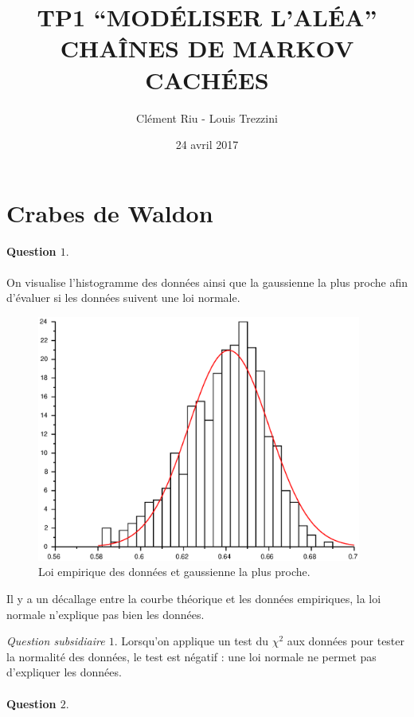 \documentclass[12pt,a4paper]{article}
\title{\textbf{TP1 “MODÉLISER L’ALÉA” \\ CHAÎNES DE MARKOV CACHÉES}}
\author{Clément Riu - Louis Trezzini}
\date{24 avril 2017}
\begin{document}
\maketitle

\setcounter{section}{1}
\section{Crabes de Waldon}

\paragraph*{Question $1.$} On visualise l'histogramme des données ainsi que la gaussienne la plus proche afin d'évaluer si les données suivent une loi normale.

\begin{figure}[H]
	\centering
	\includegraphics[width=0.95\textwidth]{images/figure0.eps}
	\caption{Loi empirique des données et gaussienne la plus proche.}
\end{figure}

Il y a un décallage entre la courbe théorique et les données empiriques, la loi normale n'explique pas bien les données.

\textit{Question subsidiaire $1.$} Lorsqu'on applique un test du $\chi^2$ aux données pour tester la normalité des données, le test est négatif : une loi normale ne permet pas d'expliquer les données.

\paragraph*{Question $2.$}
\end{document}
